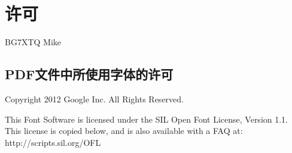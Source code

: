 \chapter*{许可}

\noindent {} BG7XTQ Mike

\section*{PDF文件中所使用字体的许可}

\noindent Copyright 2012 Google Inc. All Rights Reserved.

\noindent This Font Software is licensed under the SIL Open Font License, Version 1.1.
This license is copied below, and is also available with a FAQ at:
http://scripts.sil.org/OFL
